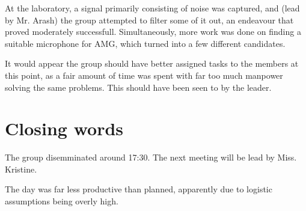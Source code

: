 \documentclass[a4paper, oneside, fleqn, halfparskip]{scrartcl}
\begin{document}
At the laboratory, a signal primarily consisting of noise was captured, and (lead by Mr. Arash) the group attempted to filter some of it out, an endeavour that proved moderately successfull. Simultaneously, more work was done on finding a suitable microphone for AMG, which turned into a few different candidates. 

It would appear the group should have better assigned tasks to the members at this point, as a fair amount of time was spent with far too much manpower solving the same problems. This should have been seen to by the leader.

\section{Closing words}
The group disemminated around 17:30. The next meeting will be lead by Miss. Kristine.

The day was far less productive than planned, apparently due to logistic assumptions being overly high.
\end{document}
